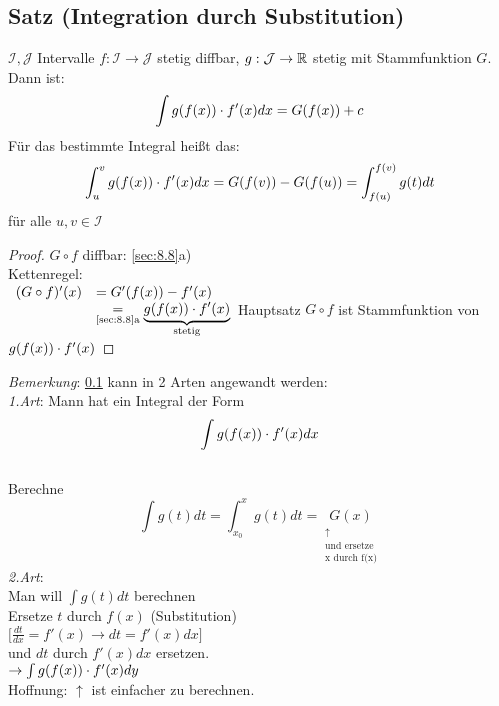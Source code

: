 \subsection{Satz (Integration durch Substitution)}\label{sec:8.13}
$\mathcal{I},\mathcal{J}$ Intervalle $f:\mathcal{I} \to \mathcal{J}$ stetig diffbar, $g: \mathcal{J} \to \mathbb{R}$ stetig mit Stammfunktion $G$. Dann ist:
\[ \int g(f(x)) \cdot f'(x)dx = G(f(x))+c \]
Für das bestimmte Integral hei\ss t das:\\
\[ \int_{u}^{v} g(f(x)) \cdot f'(x) dx = G(f(v)) - G(f(u)) = \int_{f(u)}^{f(v)} g(t)dt \]
für alle $u,v \in \mathcal{I}$
\begin{proof}
$G \circ f$ diffbar: \ref{sec:8.8}a)\\
Kettenregel:\\
$\begin{array}{ll}
(G \circ f)'(x) &= G'(f(x)) - f'(x)\\
&\underset{\text{\ref{sec:8.8}a}}{=} \underbrace{g(f(x)) \cdot f'(x)}_{\text{stetig}}
\end{array}\\
$Hauptsatz $G \circ f$ ist Stammfunktion von $g(f(x)) \cdot f'(x)$
\end{proof}
\emph{Bemerkung}:
\ref{sec:8.13} kann in 2 Arten angewandt werden:\\
\emph{1.Art}: Mann hat ein Integral der Form $$\int g(f(x)) \cdot f'(x)dx$$\\
Berechne $$\int g(t)dt = \int_{x_0}^{x}g(t)dt = \underset{\substack{\uparrow\\\text{und ersetze}\\\text{x durch f(x)}}}{G(x)}$$
\emph{2.Art}:\\
Man will $\int g(t)dt$ berechnen\\
Ersetze $t$ durch $f(x)$ (Substitution)\\
$\bigl\lbrack \frac{dt}{dx} = f'(x) \to dt = f'(x)dx \bigr\rbrack$\\
und $dt$ durch $f'(x)dx$ ersetzen.\\
$\to \int g(f(x)) \cdot f'(x) dy$\\
Hoffnung: $\uparrow$ ist einfacher zu berechnen.
